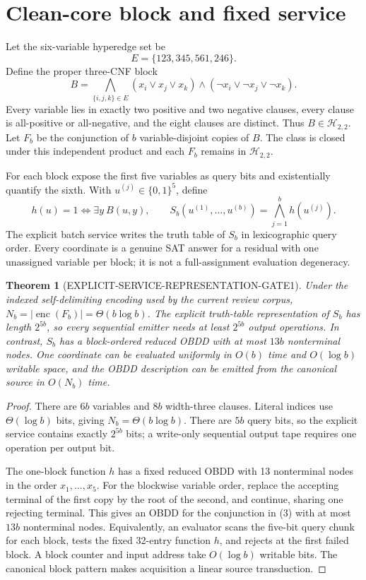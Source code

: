 \documentclass[11pt]{article}
\newtheorem{theorem}{Theorem}
\begin{document}
\section{Clean-core block and fixed service}
Let the six-variable hyperedge set be
\[
 E=\{123,345,561,246\}.
\]
Define the proper three-CNF block
\[
 B=\bigwedge_{\{i,j,k\}\in E}
 (x_i\vee x_j\vee x_k)\wedge
 (\neg x_i\vee\neg x_j\vee\neg x_k).                         \tag{2}
\]
Every variable lies in exactly two positive and two negative clauses, every
clause is all-positive or all-negative, and the eight clauses are distinct.
Thus $B\in\mathcal H_{2,2}$.  Let $F_b$ be the conjunction of $b$
variable-disjoint copies of $B$.  The class is closed under this independent
product and each $F_b$ remains in $\mathcal H_{2,2}$.

For each block expose the first five variables as query bits and existentially
quantify the sixth.  With $u^{(j)}\in\{0,1\}^5$, define
\[
 h(u)=1\iff\exists y\ B(u,y),
 \qquad
 S_b(u^{(1)},\ldots,u^{(b)})=
 \bigwedge_{j=1}^{b}h(u^{(j)}).                               \tag{3}
\]
The explicit batch service writes the truth table of $S_b$ in lexicographic
query order.  Every coordinate is a genuine SAT answer for a residual with
one unassigned variable per block; it is not a full-assignment evaluation
degeneracy.

\begin{theorem}[EXPLICIT-SERVICE-REPRESENTATION-GATE1]
Under the indexed self-delimiting encoding used by the current review
corpus, $N_b=|\operatorname{enc}(F_b)|=\Theta(b\log b)$.  The explicit
truth-table representation of $S_b$ has length $2^{5b}$, so every
sequential emitter needs at least $2^{5b}$ output operations.  In contrast,
$S_b$ has a block-ordered reduced OBDD with at most $13b$ nonterminal nodes.
One coordinate can be evaluated uniformly in $O(b)$ time and $O(\log b)$
writable space, and the OBDD description can be emitted from the canonical
source in $O(N_b)$ time.
\end{theorem}
\begin{proof}
There are $6b$ variables and $8b$ width-three clauses.  Literal indices use
$\Theta(\log b)$ bits, giving $N_b=\Theta(b\log b)$.  There are $5b$ query
bits, so the explicit service contains exactly $2^{5b}$ bits; a write-only
sequential output tape requires one operation per output bit.

The one-block function $h$ has a fixed reduced OBDD with 13 nonterminal
nodes in the order $x_1,\ldots,x_5$.  For the blockwise variable order,
replace the accepting terminal of the first copy by the root of the second,
and continue, sharing one rejecting terminal.  This gives an OBDD for the
conjunction in (3) with at most $13b$ nonterminal nodes.  Equivalently, an
evaluator scans the five-bit query chunk for each block, tests the fixed
32-entry function $h$, and rejects at the first failed block.  A block
counter and input address take $O(\log b)$ writable bits.  The canonical
block pattern makes acquisition a linear source transduction.
\end{proof}
\end{document}
